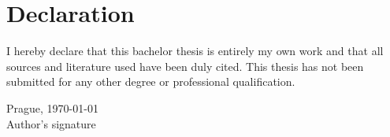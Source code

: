 \chapter*{Declaration}

I hereby declare that this bachelor thesis is entirely my own work and that all
sources and literature used have been duly cited. This thesis has not been
submitted for any other degree or professional qualification.

\vspace{2cm}

\noindent
Prague, \today \hfill \makebox[6cm]{\dotfill}\\
\hfill Author's signature
